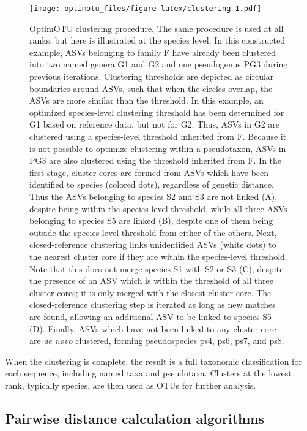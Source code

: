 \documentclass[
]{article}
\begin{document}
\begin{figure}
\centering
\texttt{[image: optimotu\_files/figure-latex/clustering-1.pdf]}
\caption{\label{fig:clustering}OptimOTU clustering procedure.
The same procedure is used at all ranks, but here is illustrated at the species level.
In this constructed example, ASVs belonging to family F have already been clustered into two named genera G1 and G2 and one pseudogenus PG3 during previous iterations.
Clustering thresholds are depicted as circular boundaries around ASVs, such that when the circles overlap, the ASVs are more similar than the threshold.
In this example, an optimized species-level clustering threshold has been determined for G1 based on reference data, but not for G2.
Thus, ASVs in G2 are clustered using a species-level threshold inherited from F.
Because it is not possible to optimize clustering within a pseudotaxon, ASVs in PG3 are also clustered using the threshold inherited from F.
In the first stage, cluster cores are formed from ASVs which have been identified to species (colored dots), regardless of genetic distance.
Thus the ASVs belonging to species S2 and S3 are not linked (A), despite being within the species-level threshold, while all three ASVs belonging to species S5 are linked (B), despite one of them being outside the species-level threshold from either of the others.
Next, closed-reference clustering links unidentified ASVs (white dots) to the nearest cluster core if they are within the species-level threshold.
Note that this does not merge species S1 with S2 or S3 (C), despite the presence of an ASV which is within the threshold of all three cluster cores; it is only merged with the closest cluster core.
The closed-reference clustering step is iterated as long as new matches are found, allowing an additional ASV to be linked to species S5 (D).
Finally, ASVs which have not been linked to any cluster core are \emph{de novo} clustered, forming pseudospecies ps4, ps6, ps7, and ps8.}
\end{figure}

When the clustering is complete, the result is a full taxonomic classification for each sequence, including named taxa and pseudotaxa.
Clusters at the lowest rank, typically species, are then used as OTUs for further analysis.

\subsection{Pairwise distance calculation algorithms}\label{pairwise-distance-calculation-algorithms}
\end{document}
